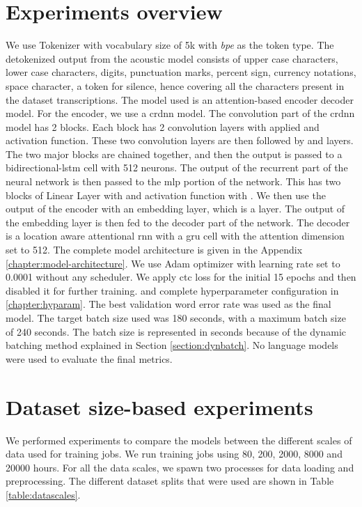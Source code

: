 \section{Experiments overview}
\label{section:exp_desc}
We use  Tokenizer with vocabulary size of 5k with \emph{bpe} as the token type. The detokenized output from the acoustic model consists of upper case characters, lower case characters, digits, punctuation marks, percent sign, currency notations, space character, a token for silence, hence covering all the characters present in the dataset transcriptions. The model used is an attention-based encoder decoder model. For the encoder, we use a \acrshort{crdnn} model. The convolution part of the \acrshort{crdnn} model has 2  blocks. Each block has 2 convolution layers with  applied and  activation function. These two convolution layers are then followed by  and  layers. The two major blocks are chained together, and then the output is passed to a bidirectional-\acrshort{lstm} cell with 512 neurons. The output of the recurrent part of the neural network is then passed to the \acrshort{mlp} portion of the network. This has two blocks of Linear Layer with  and  activation function with . We then use the output of the encoder with an embedding layer, which is a  layer. The output of the embedding layer is then fed to the decoder part of the network. The decoder is a location aware attentional \acrshort{rnn} with a \acrshort{gru} cell with the attention dimension set to 512. The complete model architecture is given in the Appendix \ref{chapter:model-architecture}. We use Adam optimizer with learning rate set to 0.0001 without any scheduler. We apply \acrshort{ctc} loss for the initial 15 epochs and then disabled it for further training. and complete hyperparameter configuration in \ref{chapter:hyparam}. The best validation word error rate was used as the final model. The target batch size used was 180 seconds, with a maximum batch size of 240 seconds. The batch size is represented in seconds because of the dynamic batching method explained in Section \ref{section:dynbatch}. No language models were used to evaluate the final metrics.  

\section{Dataset size-based experiments}
\label{section:res_scale}
We performed experiments to compare the models between the different scales of data used for training jobs. We run training jobs using 80, 200, 2000, 8000 and 20000 hours. For all the data scales, we spawn two processes for data loading and preprocessing. The different dataset splits that were used are shown in Table \ref{table:datascales}.

